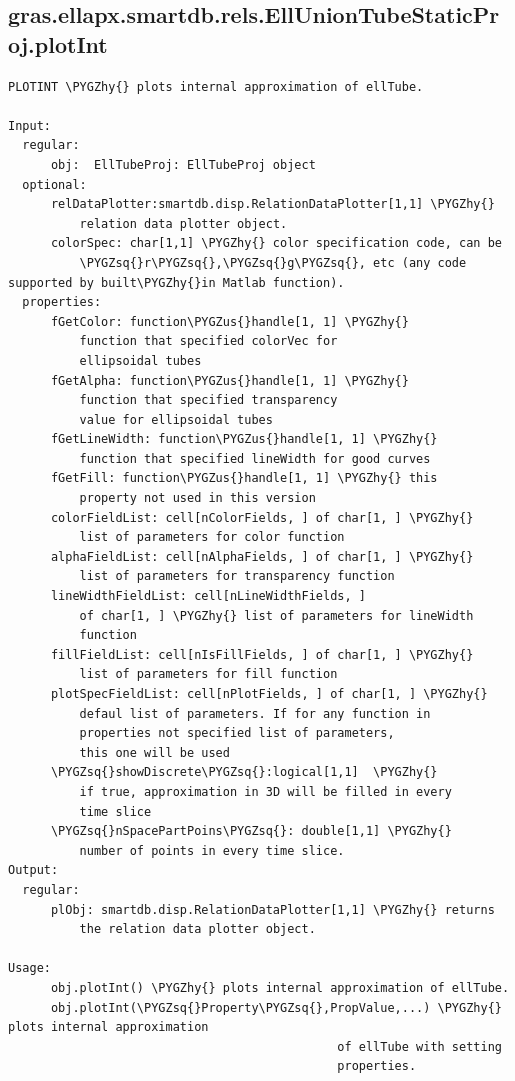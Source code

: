 \documentclass[letterpaper,10pt,english]{sphinxmanual}
\def\PYGZus{\char`\_}
\def\PYGZhy{\char`\-}
\def\PYGZsq{\char`\'}
\begin{document}
\subsection{gras.ellapx.smartdb.rels.EllUnionTubeStaticProj.plotInt}
\label{chap_functions:gras-ellapx-smartdb-rels-elluniontubestaticproj-plotint}
\begin{Verbatim}[commandchars=\\\{\}]
PLOTINT \PYGZhy{} plots internal approximation of ellTube.

Input:
  regular:
      obj:  EllTubeProj: EllTubeProj object
  optional:
      relDataPlotter:smartdb.disp.RelationDataPlotter[1,1] \PYGZhy{}
          relation data plotter object.
      colorSpec: char[1,1] \PYGZhy{} color specification code, can be
          \PYGZsq{}r\PYGZsq{},\PYGZsq{}g\PYGZsq{}, etc (any code supported by built\PYGZhy{}in Matlab function).
  properties:
      fGetColor: function\PYGZus{}handle[1, 1] \PYGZhy{}
          function that specified colorVec for
          ellipsoidal tubes
      fGetAlpha: function\PYGZus{}handle[1, 1] \PYGZhy{}
          function that specified transparency
          value for ellipsoidal tubes
      fGetLineWidth: function\PYGZus{}handle[1, 1] \PYGZhy{}
          function that specified lineWidth for good curves
      fGetFill: function\PYGZus{}handle[1, 1] \PYGZhy{} this
          property not used in this version
      colorFieldList: cell[nColorFields, ] of char[1, ] \PYGZhy{}
          list of parameters for color function
      alphaFieldList: cell[nAlphaFields, ] of char[1, ] \PYGZhy{}
          list of parameters for transparency function
      lineWidthFieldList: cell[nLineWidthFields, ]
          of char[1, ] \PYGZhy{} list of parameters for lineWidth
          function
      fillFieldList: cell[nIsFillFields, ] of char[1, ] \PYGZhy{}
          list of parameters for fill function
      plotSpecFieldList: cell[nPlotFields, ] of char[1, ] \PYGZhy{}
          defaul list of parameters. If for any function in
          properties not specified list of parameters,
          this one will be used
      \PYGZsq{}showDiscrete\PYGZsq{}:logical[1,1]  \PYGZhy{}
          if true, approximation in 3D will be filled in every
          time slice
      \PYGZsq{}nSpacePartPoins\PYGZsq{}: double[1,1] \PYGZhy{}
          number of points in every time slice.
Output:
  regular:
      plObj: smartdb.disp.RelationDataPlotter[1,1] \PYGZhy{} returns
          the relation data plotter object.

Usage:
      obj.plotInt() \PYGZhy{} plots internal approximation of ellTube.
      obj.plotInt(\PYGZsq{}Property\PYGZsq{},PropValue,...) \PYGZhy{} plots internal approximation
                                              of ellTube with setting
                                              properties.
\end{Verbatim}
\end{document}
